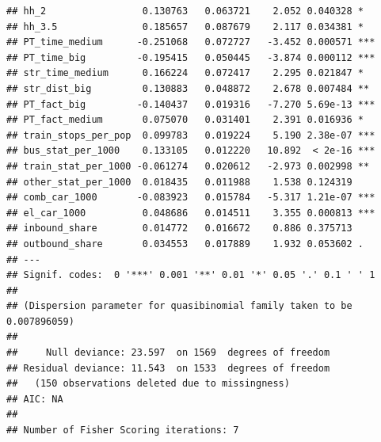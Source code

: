 \documentclass[
]{article}
\newenvironment{Shaded}{\begin{snugshade}}{\end{snugshade}}
\newcommand{\AttributeTok}[1]{\textcolor[rgb]{0.77,0.63,0.00}{#1}}
\newcommand{\ConstantTok}[1]{\textcolor[rgb]{0.00,0.00,0.00}{#1}}
\newcommand{\FloatTok}[1]{\textcolor[rgb]{0.00,0.00,0.81}{#1}}
\newcommand{\FunctionTok}[1]{\textcolor[rgb]{0.00,0.00,0.00}{#1}}
\newcommand{\NormalTok}[1]{#1}
\newcommand{\SpecialCharTok}[1]{\textcolor[rgb]{0.00,0.00,0.00}{#1}}
\begin{document}
\begin{verbatim}
## hh_2                 0.130763   0.063721    2.052 0.040328 *  
## hh_3.5               0.185657   0.087679    2.117 0.034381 *  
## PT_time_medium      -0.251068   0.072727   -3.452 0.000571 ***
## PT_time_big         -0.195415   0.050445   -3.874 0.000112 ***
## str_time_medium      0.166224   0.072417    2.295 0.021847 *  
## str_dist_big         0.130883   0.048872    2.678 0.007484 ** 
## PT_fact_big         -0.140437   0.019316   -7.270 5.69e-13 ***
## PT_fact_medium       0.075070   0.031401    2.391 0.016936 *  
## train_stops_per_pop  0.099783   0.019224    5.190 2.38e-07 ***
## bus_stat_per_1000    0.133105   0.012220   10.892  < 2e-16 ***
## train_stat_per_1000 -0.061274   0.020612   -2.973 0.002998 ** 
## other_stat_per_1000  0.018435   0.011988    1.538 0.124319    
## comb_car_1000       -0.083923   0.015784   -5.317 1.21e-07 ***
## el_car_1000          0.048686   0.014511    3.355 0.000813 ***
## inbound_share        0.014772   0.016672    0.886 0.375713    
## outbound_share       0.034553   0.017889    1.932 0.053602 .  
## ---
## Signif. codes:  0 '***' 0.001 '**' 0.01 '*' 0.05 '.' 0.1 ' ' 1
## 
## (Dispersion parameter for quasibinomial family taken to be 0.007896059)
## 
##     Null deviance: 23.597  on 1569  degrees of freedom
## Residual deviance: 11.543  on 1533  degrees of freedom
##   (150 observations deleted due to missingness)
## AIC: NA
## 
## Number of Fisher Scoring iterations: 7
\end{verbatim}

\begin{Shaded}
\end{Shaded}
\end{document}

